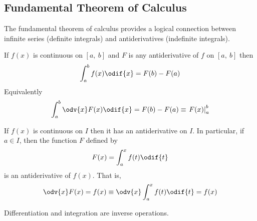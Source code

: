 \documentclass{article}
\begin{document}
\subsection{Fundamental Theorem of Calculus}
The fundamental theorem of calculus provides a logical connection between
infinite series (definite integrals) and antiderivatives
(indefinite integrals).
\begin{theorem}
    If \(f(x)\) is continuous on \(\left[ a,\:b \right]\) and \(F\) is any
    antiderivative of \(f\) on \(\left[ a,\:b \right]\) then
    \begin{equation*}
        \int_a^b f(x)\odif{x} = F(b) - F(a)
    \end{equation*}
    Equivalently
    \begin{equation*}
        \int_a^b \odv{x}F(x) \odif{x} = F(b) - F(a) \equiv \left.F(x)\right|_a^b
    \end{equation*}
\end{theorem}
\begin{theorem}
    If \(f(x)\) is continuous on \(I\) then it has an antiderivative on \(I\). In
    particular, if \(a\in I\), then the function \(F\) defined by
    \begin{equation*}
        F(x) = \int_a^x f(t)\odif{t}
    \end{equation*}
    is an antiderivative of \(f(x)\). That is,
    \begin{equation*}
        \odv{x}F(x) = f(x) \equiv \odv{x}\int_a^x f(t) \odif{t} = f(x)
    \end{equation*}
\end{theorem}
\begin{theorem}
    Differentiation and integration are inverse operations.
\end{theorem}
\newpage
\end{document}
